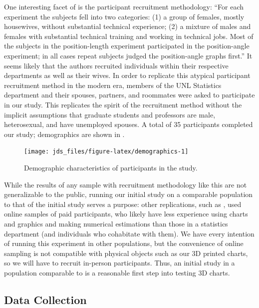 \documentclass[letterpaper,inpress,dvipsnames]{jdsart}
\begin{document}
One interesting facet of \citet{clevelandGraphical1984} is the participant recruitment methodology: ``For each experiment the subjects fell into two categories: (1) a group of females, mostly housewives, without substantial technical experience; (2) a mixture of males and females with substantial technical training and working in technical jobs.
Most of the subjects in the position-length experiment participated in the position-angle experiment; in all cases repeat subjects judged the position-angle graphs first.''
It seems likely that the authors recruited individuals within their respective departments as well as their wives.
In order to replicate this atypical participant recruitment method in the modern era, members of the UNL Statistics department and their spouses, partners, and roommates were asked to participate in our study.
This replicates the spirit of the recruitment method without the implicit assumptions that graduate students and professors are male, heterosexual, and have unemployed spouses.
A total of 35 participants completed our study; demographics are shown in .

\begin{figure}
\texttt{[image: jds\_files/figure-latex/demographics-1]} \caption{Demographic characteristics of participants in the study.}\label{fig:demographics}
\end{figure}

While the results of any sample with recruitment methodology like this are not generalizable to the public, running our initial study on a comparable population to that of the initial study serves a purpose: other replications, such as \citet{heerCrowdsourcingGraphicalPerception2010b}, used online samples of paid participants, who likely have less experience using charts and graphics and making numerical estimations than those in a statistics department (and individuals who cohabitate with them). We have every intention of running this experiment in other populations, but the convenience of online sampling is not compatible with physical objects such as our 3D printed charts, so we will have to recruit in-person participants. Thus, an initial study in a population comparable to \citet{clevelandGraphical1984} is a reasonable first step into testing 3D charts.

\hypertarget{data-collection}{%
\subsection{Data Collection}\label{data-collection}}
\end{document}
